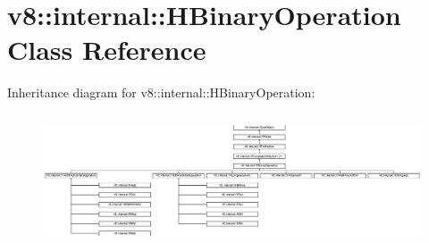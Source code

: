\hypertarget{classv8_1_1internal_1_1_h_binary_operation}{}\section{v8\+:\+:internal\+:\+:H\+Binary\+Operation Class Reference}
\label{classv8_1_1internal_1_1_h_binary_operation}
Inheritance diagram for v8\+:\+:internal\+:\+:H\+Binary\+Operation\+:\begin{figure}[H]
\begin{center}
\leavevmode
\includegraphics[height=3.902439cm]{classv8_1_1internal_1_1_h_binary_operation}
\end{center}
\end{figure}
